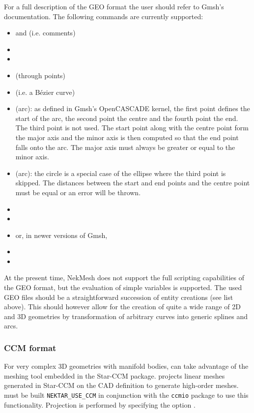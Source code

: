 For a full description of the GEO format the user should refer to Gmsh's
documentation. The following commands are currently supported:
\begin{itemize}
  \item \inltt{//} and \inltt{/* */} (i.e. comments)
  \item {}
  \item {}
  \item {} (through points)
  \item {} (i.e. a B\'{e}zier curve)
  \item {} (arc): as defined in Gmsh's OpenCASCADE kernel, the first
    point defines the start of the arc, the second point the centre and the fourth
    point the end. The third point is not used. The start point along with the centre
    point form the major axis and the minor axis is then computed so that the end
    point falls onto the arc. The major axis must always be greater or equal to the
    minor axis.
  \item {} (arc): the circle is a special case of the ellipse where the
    third point is skipped. The distances between the start and end points and the
    centre point must be equal or an error will be thrown.
  \item {}
  \item {}
  \item {} or, in newer versions of Gmsh, 
  \item {}
  \item {}
\end{itemize}

At the present time, NekMesh does not support the full scripting capabilities of
the GEO format, but the evaluation of simple variables is supported. The used
GEO files should be a straightforward succession of entity creations (see list
above). This should however allow for the creation of quite a wide range of 2D
and 3D geometries by transformation of arbitrary curves into generic splines and
arcs.

\subsubsection{CCM format}
For very complex 3D geometries with manifold bodies, \nekpp can take advantage of the meshing tool embedded in the Star-CCM package. \nm projects linear meshes generated in Star-CCM on the CAD definition to generate high-order meshes. \nekpp must be built \texttt{NEKTAR\_USE\_CCM} in conjunction with the \texttt{ccmio} package to use this functionality. Projection is performed by specifying the option .

